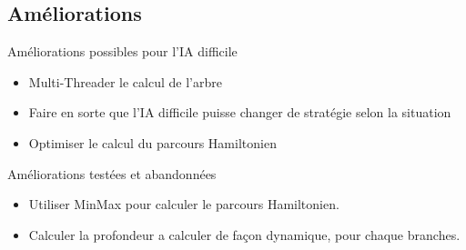 \documentclass{beamer}
\begin{document}
\subsection{Améliorations}
\begin{frame}{}
\begin{block}{Améliorations possibles pour l'IA difficile}
\begin{itemize}
 \item<1-> Multi-Threader le calcul de l’arbre
 \item<2-> Faire en sorte que l’IA difficile puisse changer de stratégie selon la situation
 \item<3-> Optimiser le calcul du parcours Hamiltonien
\end{itemize}
\end{block}
\end{frame}

\begin{frame}{}
\begin{block}{Améliorations testées et abandonnées}
\begin{itemize}
 \item<1-> Utiliser MinMax pour calculer le parcours Hamiltonien. 
 \item<2-> Calculer la profondeur a calculer de façon dynamique, pour chaque branches.
\end{itemize}
\end{block}
\end{frame}
\end{document}

